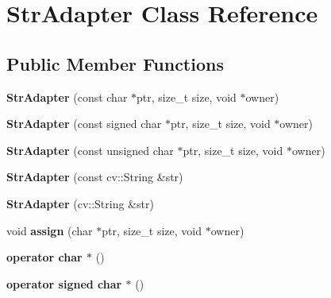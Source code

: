 \hypertarget{class_str_adapter}{}\section{Str\+Adapter Class Reference}
\label{class_str_adapter}
\subsection*{Public Member Functions}
\begin{DoxyCompactItemize}
\item 
\mbox{\label{class_str_adapter_ae6ce77109507fa78ac3fcb8bcf7add39}} 
{\bfseries Str\+Adapter} (const char $\ast$ptr, size\+\_\+t size, void $\ast$owner)
\item 
\mbox{\label{class_str_adapter_a6f51a770bb8289d326646ebe5fd15835}} 
{\bfseries Str\+Adapter} (const signed char $\ast$ptr, size\+\_\+t size, void $\ast$owner)
\item 
\mbox{\label{class_str_adapter_aa8c8ca6fb64a6f7a67366cbda92578ef}} 
{\bfseries Str\+Adapter} (const unsigned char $\ast$ptr, size\+\_\+t size, void $\ast$owner)
\item 
\mbox{\label{class_str_adapter_ab87f082a06b14a4970c6c99ab44b9378}} 
{\bfseries Str\+Adapter} (const cv\+::\+String \&str)
\item 
\mbox{\label{class_str_adapter_acaa323ba77bfb07724103553e9cb9cc4}} 
{\bfseries Str\+Adapter} (cv\+::\+String \&str)
\item 
\mbox{\label{class_str_adapter_a0a4095b7c5f864396eb560e1fd165a61}} 
void {\bfseries assign} (char $\ast$ptr, size\+\_\+t size, void $\ast$owner)
\item 
\mbox{\label{class_str_adapter_a5539711ac64522bf5c2b303b00a75b46}} 
{\bfseries operator char $\ast$} ()
\item 
\mbox{\label{class_str_adapter_aaa47321ca0a89a07d2d0201068d111ba}} 
{\bfseries operator signed char $\ast$} ()
\item 
\mbox{\label{class_str_adapter_a6add3da396262d47df2092910ed370d7}} 

\end{DoxyCompactItemize}
